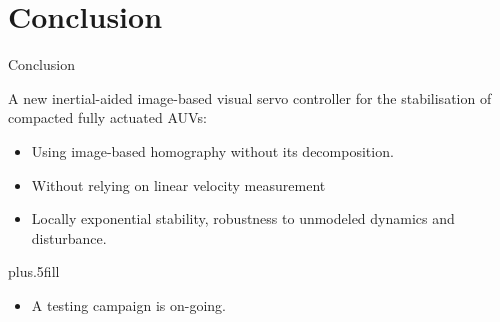 \documentclass{beamer}
\begin{document}
\section{Conclusion}

\begin{frame}{Conclusion}

  A new inertial-aided image-based visual servo controller for the stabilisation of compacted fully actuated AUVs:
  \begin{itemize}
  \item
    Using image-based homography without its decomposition.
  \item
    Without relying on linear velocity measurement
  \item
    Locally exponential stability, robustness to unmodeled dynamics and disturbance.
  \end{itemize}
  
  \vskip0pt plus.5fill
  \begin{itemize}
  \item
    A testing campaign is on-going.    
  \end{itemize}
\end{frame}


\begin{frame}

\end{frame}



%
%    
%    
%
% 
%    
%
\end{document}

